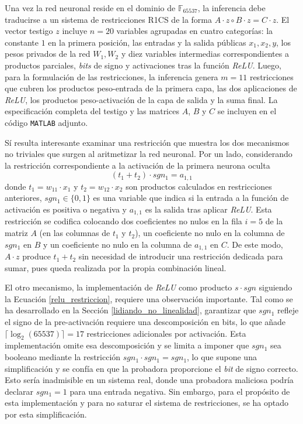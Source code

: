 \documentclass[a4paper, 11pt]{article}
\begin{document}
Una vez la red neuronal reside en el dominio de $\mathbb{F}_{65537}$, la inferencia debe traducirse
a un sistema de restricciones R1CS de la forma $A \cdot z \circ B \cdot z = C \cdot z$. El vector
testigo $z$ incluye $n = 20$ variables agrupadas en cuatro categorías: la constante $1$ en la primera
posición, las entradas y la salida públicas $x_1, x_2, y$, los pesos privados de la red $W_1, W_2$
y diez variables intermedias correspondientes a productos parciales, \textit{bits} de signo y
activaciones tras la función \textit{ReLU}. Luego, para la formulación de las restricciones, la
inferencia genera $m = 11$ restricciones que cubren los productos peso-entrada de la primera capa,
las dos aplicaciones de \textit{ReLU}, los productos peso-activación de la capa de salida y la suma
final. La especificación completa del testigo y las matrices $A$, $B$ y $C$ se incluyen en el código
\texttt{MATLAB} adjunto.

Sí resulta interesante examinar una restricción que muestra los dos mecanismos no triviales que
surgen al aritmetizar la red neuronal. Por un lado, considerando la restricción correspondiente a la
activación de la primera neurona oculta
\begin{equation}
  (t_1 + t_2) \cdot sgn_1 = a_{1,1} \label{restriccion_relu}
\end{equation}
donde $t_1 = w_{11} \cdot x_1$ y $t_2 = w_{12} \cdot x_2$ son productos calculados en restricciones
anteriores, $sgn_1 \in \{0, 1\}$ es una variable que indica si la entrada a la función de activación
es positiva o negativa y $a_{1,1}$ es la salida tras aplicar \textit{ReLU}. Esta restricción se
codifica colocando dos coeficientes no nulos en la fila $i = 5$ de la matriz $A$ (en las columnas de
$t_1$ y $t_2$), un coeficiente no nulo en la columna de $sgn_1$ en $B$ y un coeficiente no nulo en la
columna de $a_{1,1}$ en $C$. De este modo, $A \cdot z$ produce $t_1 + t_2$ sin necesidad de
introducir una restricción dedicada para sumar, pues queda realizada por la propia combinación
lineal.

El otro mecanismo, la implementación de \textit{ReLU} como producto $s \cdot sgn$ siguiendo la
Ecuación \ref{relu_restriccion}, requiere una observación importante. Tal como se ha desarrollado en
la Sección \ref{lidiando_no_linealidad}, garantizar que $sgn_1$ refleje el signo de la pre-activación
requiere una descomposición en bits, lo que añade $\lceil \log_2(65537) \rceil = 17$ restricciones
adicionales por activación. Esta implementación omite esa descomposición y se limita a imponer que
$sgn_1$ sea booleano mediante la restricción $sgn_1 \cdot sgn_1 = sgn_1$, lo que supone una
simplificación y se confía en que la probadora proporcione el \textit{bit} de signo correcto. Esto
sería inadmisible en un sistema real, donde una probadora maliciosa podría declarar $sgn_1 = 1$ para
una entrada negativa. Sin embargo, para el propósito de esta implementación y para no saturar el
sistema de restricciones, se ha optado por esta simplificación.
\end{document}
